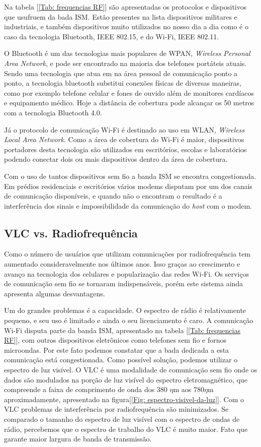 Na tabela [\ref{Tab: frequencias RF}] são apresentadas os protocolos e dispositivos que usufruem da bada ISM. Estão presentes na lista dispositivos militares e industriais, e também dispositivos muito utilizados no nosso dia a dia como é o caso da tecnologia Bluetooth, IEEE 802.15, e do Wi-Fi, IEEE 802.11. 

O Bluetooth é  um das tecnologias mais populares de WPAN, \textit{Wireless Personal Area Network}, e pode ser encontrado na maioria dos telefones portáteis atuais. 
Sendo uma tecnologia que atua em na área pessoal de comunicação ponto a ponto, a tecnologia bluetooth substitui conexões físicas de diversas maneiras, como por exemplo telefone celular e fones de ouvido além de monitores cardíacos e equipamento médico.\cite{1368913}
Hoje a distância de cobertura pode alcançar os 50 metros com a tecnologia Bluetooth 4.0. \cite{Bluetooth}

Já o protocolo de comunicação Wi-Fi é destinado ao uso em WLAN, \textit{Wireless Local Area Network}. Como a área de cobertura do Wi-Fi é maior, dispositivos portadores desta tecnologia são utilizados em escritórios, escolas e laboratórios podendo conectar dois ou mais dispositivos dentro da área de cobertura.

Com o uso de tantos dispositivos sem fio a banda ISM se encontra congestionada. Em prédios residenciais e escritórios vários modems disputam por um dos canais de comunicação disponíveis, e quando não o encontram o resultado é a interferência dos sinais e impossibilidade da comunicação do \textit{host} com o modem.

\subsection{VLC vs. Radiofrequência}

Como o número de usuários que utilizam comunicações por radiofrequência tem aumentado consideravelmente nos últimos anos. Isso graças ao crescimento e avanço na tecnologia dos celulares e popularização das redes Wi-Fi. Os serviços de comunicação sem fio se tornaram indispensáveis, porém este sistema ainda apresenta algumas desvantagens.

Um do grandes problemas é a capacidade. O espectro de rádio é relativamente pequeno, e seu uso é limitado e ainda o seu licenciamento é caro. A comunicação Wi-Fi disputa parte da banda ISM, apresentado na tabela [\ref{Tab: frequencias RF}], com outros dispositivos eletrônicos como telefones sem fio e fornos microondas. Por este fato podemos constatar que a bada dedicada a esta comunicação está congestionada.\cite{boucheto.2006} Como possível solução, podemos utilizar o espectro de luz visível. O VLC é uma modalidade de comunicação sem fio onde os dados são modulados na porção de luz visível do espectro eletromagnético, que compreende a faixa de comprimento de onda dos 380 $\eta$m aos 780$\eta$m aproximadamente, apresentado na figura[\ref{Fig: espectro-visivel-da-luz}]. Com o VLC problemas de interferência por radiofrequência são minimizados.
Se comparado o tamanho do espectro de luz visível com o espectro de ondas de rádio, percebemos que o espectro de trabalho do VLC é muito maior. Fato que garante maior largura de banda de transmissão.

